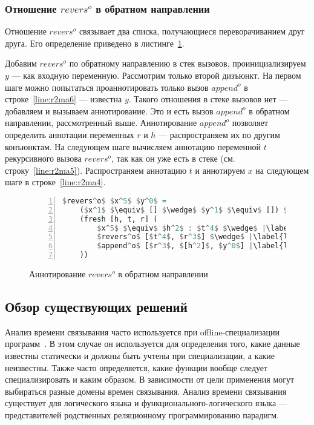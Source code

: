 \documentclass[conference,american,russian]{IEEEtran}
\begin{document}
\subsubsection{Отношение $revers^o$ в обратном направлении}

Отношение $revers^o$ связывает два списка, получающиеся переворачиванием друг друга.
Его определение приведено в листинге~\ref{lst:reversoANN2}.

Добавим $revers^o$ по обратному направлению в стек вызовов, проинициализируем $y$ --- как входную переменную.
Рассмотрим только второй дизъюнкт.
На первом шаге можно попытаться проаннотировать только вызов $append^o$ в строке~\ref{line:r2ma6} --- известна $y$.
Такого отношения в стеке вызовов нет --- добавляем и вызываем аннотирование.
Это и есть вызов $append^o$ в обратном направлении, рассмотренный выше.
Аннотирование $append^o$ позволяет определить аннотации переменных $r$ и $h$ --- распространяем их по другим конъюнктам.
На следующем шаге вычисляем аннотацию переменной $t$ рекурсивного вызова $revers^o$, так как он уже есть в стеке (см. строку~\ref{line:r2ma5}).
Распространяем аннотацию $t$ и аннотируем $x$ на следующем шаге в строке~\ref{line:r2ma4}.

\begin{figure}[h!]
  \begin{center}
  \begin{minipage}{0.3\textwidth}
  \begin{lstlisting}[language=Haskell, frame=single, numbers=left,numberstyle=\small, escapechar=|]
  $revers^o$ $x^5$ $y^0$ =
    ($x^1$ $\equiv$ [] $\wedge$ $y^1$ $\equiv$ []) $\vee$ |\label{line:r2ma2}|
    (fresh [h, t, r] (
        $x^5$ $\equiv$ $h^2$ : $t^4$ $\wedge$ |\label{line:r2ma4}|
        $revers^o$ [$t^4$, $r^3$] $\wedge$ |\label{line:r2ma5}|
        $append^o$ [$r^3$, $[h^2]$, $y^0$] |\label{line:r2ma6}|
    ))
    \end{lstlisting}
  \end{minipage}
  \end{center}
  \caption{Аннотирование $revers^o$ в обратном направлении}
  \label{lst:reversoANN2}
\end{figure}

\subsection{Обзор существующих решений}

Анализ времени связывания часто используется при offline-специализации программ~\cite{jones1993partial}. 
В этом случае он используется для определения того, какие данные известны статически и должны быть учтены при специализации, а какие неизвестны. 
Также часто определяется, какие функции вообще следует специализировать и каким образом. 
В зависимости от цели применения могут выбираться разные домены времен связывания.
Анализ времени связывания существует для логического языка \prolog{} и функционального-логического языка \mercury{} --- представителей родственных реляционному программированию парадигм.
\end{document}
